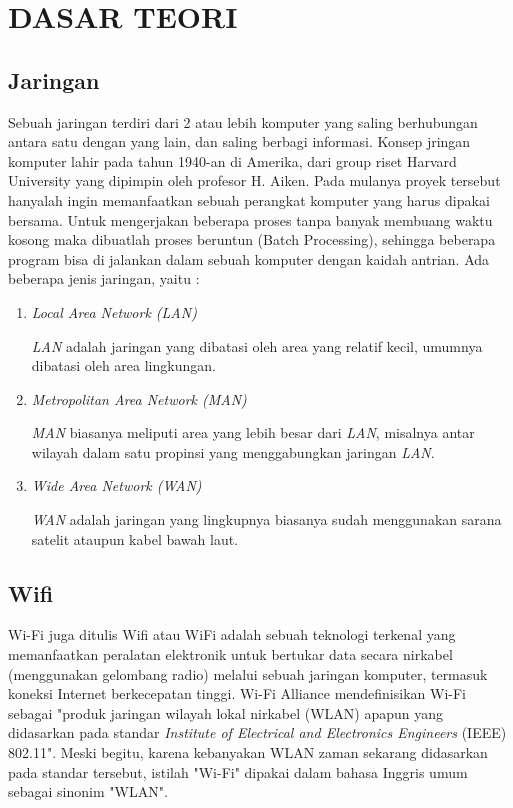 \documentclass{jtetiproposalskripsi}
\begin{document}
\chapter{DASAR TEORI}                

\section{Jaringan}
Sebuah jaringan terdiri dari 2 atau lebih komputer yang saling berhubungan antara satu dengan yang lain, dan saling berbagi informasi. Konsep jringan komputer lahir pada tahun 1940-an di Amerika, dari group riset Harvard University yang dipimpin oleh profesor H. Aiken. Pada mulanya proyek tersebut hanyalah ingin memanfaatkan sebuah perangkat komputer yang harus dipakai bersama. Untuk mengerjakan beberapa proses tanpa banyak membuang waktu kosong maka dibuatlah proses beruntun (Batch Processing), sehingga beberapa program bisa di jalankan dalam sebuah komputer dengan kaidah antrian. Ada beberapa jenis jaringan, yaitu :

\begin{enumerate}
\item \emph{Local Area Network (LAN)}

\emph{LAN} adalah jaringan yang dibatasi oleh area yang relatif kecil, umumnya dibatasi oleh area lingkungan.
\item \emph{Metropolitan Area Network (MAN)}

\emph{MAN} biasanya meliputi area yang lebih besar dari \emph{LAN}, misalnya antar wilayah dalam satu propinsi yang menggabungkan jaringan \emph{LAN}.
\item \emph{Wide Area Network (WAN)}

\emph{WAN} adalah jaringan yang lingkupnya biasanya sudah menggunakan sarana satelit ataupun kabel bawah laut.
\end{enumerate}

\section{Wifi}
Wi-Fi juga ditulis Wifi atau WiFi adalah sebuah teknologi terkenal yang memanfaatkan peralatan elektronik untuk bertukar data secara nirkabel (menggunakan gelombang radio) melalui sebuah jaringan komputer, termasuk koneksi Internet berkecepatan tinggi. Wi-Fi Alliance mendefinisikan Wi-Fi sebagai "produk jaringan wilayah lokal nirkabel (WLAN) apapun yang didasarkan pada standar \emph{Institute of Electrical and Electronics Engineers} (IEEE) 802.11". Meski begitu, karena kebanyakan WLAN zaman sekarang didasarkan pada standar tersebut, istilah "Wi-Fi" dipakai dalam bahasa Inggris umum sebagai sinonim "WLAN".
\end{document}
